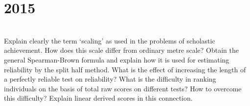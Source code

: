 \section*{2015}
\vspace{-.5cm}
\hrulefill \smallskip\\
 Explain clearly the term `scaling' as used in the problems of scholastic achievement. How does this scale differ from ordinary metre scale?
\myline
{} Obtain the general Spearman-Brown formula and explain how it is used for estimating reliability by the split half method. What is the effect of increasing the length of a perfectly reliable test on reliability?
\myline
{} What is the difficulty in ranking individuals on the basis of total raw scores on different tests? How to overcome this difficulty? Explain linear derived scores in this connection.
